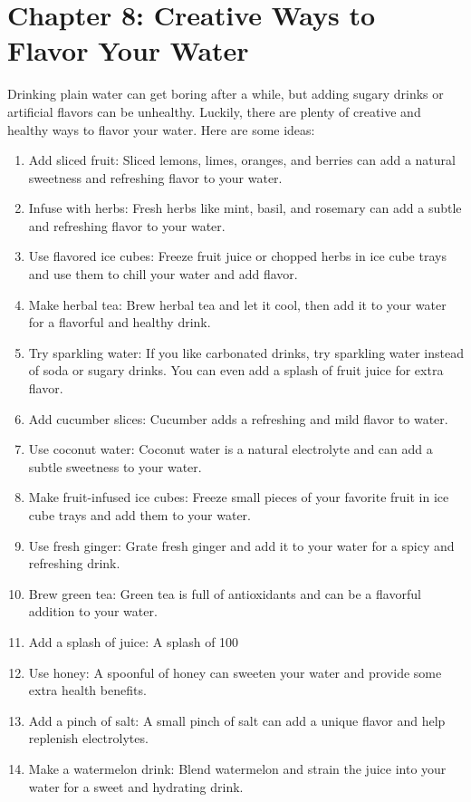 \chapter{Chapter 8: Creative Ways to Flavor Your Water
}

Drinking plain water can get boring after a while, but adding sugary drinks or artificial flavors can be unhealthy. Luckily, there are plenty of creative and healthy ways to flavor your water. Here are some ideas:

\begin{enumerate}
\item Add sliced fruit: Sliced lemons, limes, oranges, and berries can add a natural sweetness and refreshing flavor to your water.
\item Infuse with herbs: Fresh herbs like mint, basil, and rosemary can add a subtle and refreshing flavor to your water.
\item Use flavored ice cubes: Freeze fruit juice or chopped herbs in ice cube trays and use them to chill your water and add flavor.
\item Make herbal tea: Brew herbal tea and let it cool, then add it to your water for a flavorful and healthy drink.
\item Try sparkling water: If you like carbonated drinks, try sparkling water instead of soda or sugary drinks. You can even add a splash of fruit juice for extra flavor.
\item Add cucumber slices: Cucumber adds a refreshing and mild flavor to water.
\item Use coconut water: Coconut water is a natural electrolyte and can add a subtle sweetness to your water.
\item Make fruit-infused ice cubes: Freeze small pieces of your favorite fruit in ice cube trays and add them to your water.
\item Use fresh ginger: Grate fresh ginger and add it to your water for a spicy and refreshing drink.
\item Brew green tea: Green tea is full of antioxidants and can be a flavorful addition to your water.
\item Add a splash of juice: A splash of 100%
\item Use honey: A spoonful of honey can sweeten your water and provide some extra health benefits.
\item Add a pinch of salt: A small pinch of salt can add a unique flavor and help replenish electrolytes.
\item Make a watermelon drink: Blend watermelon and strain the juice into your water for a sweet and hydrating drink.

\end{enumerate}
